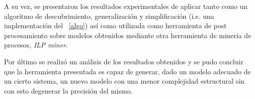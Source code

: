 A su vez, se presentaron los resultados experimentales de aplicar \pachtool tanto como un algoritmo de 
descubrimiento, generalización y simplificación (i.e. una implementación del ~\autoref{algo}) así como 
utilizada como herramienta de post procesamiento sobre modelos obtenidos mediante otra herramienta de 
minería de procesos, \textit{ILP miner}.

Por último se realizó un análisis de los resultados obtenidos y se pudo concluir que la herramienta presentada
es capaz de generar, dado un modelo adecuado de un cierto sistema, un nuevo modelo con una menor complejidad 
estructural sin con esto degenerar la precisión del mismo.


